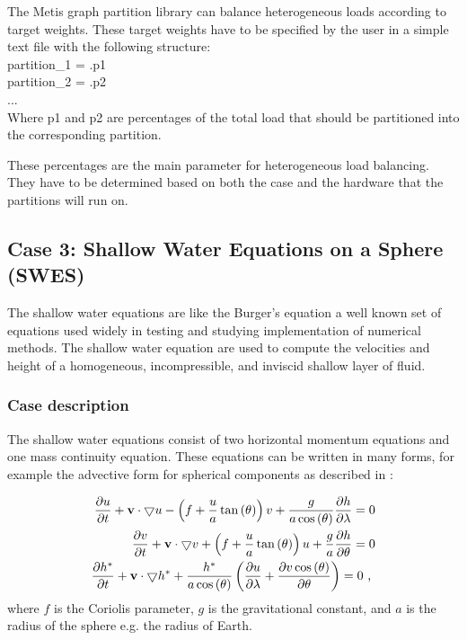 The Metis graph partition library can balance heterogeneous loads according to target weights.
These target weights have to be specified by the user in a simple text file with the following structure:
\\
partition\_1 = .p1
\\
partition\_2 = .p2
\\
...
\\
Where p1 and p2 are percentages of the total load that should be partitioned into the corresponding partition.

These percentages are the main parameter for heterogeneous load balancing.
They have to be determined based on both the case and the hardware that the partitions will run on.



\newpage
\subsection{Case 3: Shallow Water Equations on a Sphere (SWES)}
The shallow water equations are like the Burger's equation a well known set of equations used widely in testing and studying implementation of numerical methods.
The shallow water equation are used to compute the velocities and height of a homogeneous, incompressible, and inviscid shallow layer of fluid.

\subsubsection{Case description}
The shallow water equations consist of two horizontal momentum equations and one mass continuity equation.
These equations can be written in many forms, for example the advective form for spherical components as described in \citet{williamson1992standard}:

\begin{equation}
\label{eq:swes}
\begin{split}
\frac{\partial u}{\partial t} + \mathbf{v} \cdot \bigtriangledown u - \left( f + \frac{u}{a} \tan \left( \theta \right) \right) v + \frac{g}{a \cos \left( \theta \right)} \frac{\partial h}{\partial \lambda} = 0 \\
\frac{\partial v}{\partial t} + \mathbf{v} \cdot \bigtriangledown v + \left( f + \frac{u}{a} \tan \left( \theta \right) \right) u + \frac{g}{a} \frac{\partial h}{\partial \theta} = 0  \\
\frac{\partial h^*}{\partial t} + \mathbf{v} \cdot \bigtriangledown h^* + \frac{h^*}{a \cos \left( \theta \right)} \left( \frac{\partial u}{\partial \lambda} + \frac{\partial v \cos \left( \theta \right)}{\partial \theta} \right) = 0 \text{ , }
\end{split}
\end{equation}
where $f$ is the Coriolis parameter, $g$ is the gravitational constant, and $a$ is the radius of the sphere e.g. the radius of Earth.

